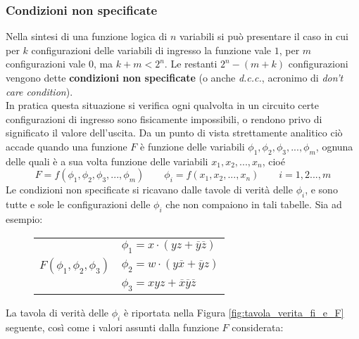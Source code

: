 \documentclass[a4paper]{extarticle}
\begin{document}
\subsubsection{Condizioni non specificate}
Nella sintesi di una funzione logica di \(n\) variabili si può presentare il caso in cui per \(k\) configurazioni delle variabili di ingresso la funzione vale \(1\), per \(m\) configurazioni vale \(0\), ma \(k + m < 2^n\). Le restanti \(2^n - (m + k)\) configurazioni vengono dette \textbf{condizioni non specificate} (o anche \emph{d.c.c.}, acronimo di \textit{don’t care condition}).\\
In pratica questa situazione si verifica ogni qualvolta in un circuito certe configurazioni di ingresso sono fisicamente impossibili, o rendono privo di significato il valore dell’uscita. Da un punto di vista strettamente analitico ciò accade quando una funzione \(F\) è funzione delle variabili \(\phi_1, \phi_2, \phi_3, ..., \phi_m\), ognuna delle quali è a sua volta funzione delle variabili \(x_1, x_2, ..., x_n\), cioé
\[F = f \left(\phi_1, \phi_2, \phi_3, ..., \phi_m\right) \hspace{2em} \phi_i = f \left(x_1, x_2, ..., x_n\right) \hspace{2em} i = 1, 2..., m\]
Le condizioni non specificate si ricavano dalle tavole di verità delle $\phi_i$, e sono tutte e sole le configurazioni delle $\phi_i$ che non compaiono in tali tabelle. Sia ad esempio:

\vspace{1em}
\noindent
\begin{figure}[H]
    \centering
    \begin{tabular}{cl}
     & \(\phi_1 = x \cdot \left(yz + \overline{y}\overline{z}\right)\)\\
     \(F \left(\phi_1, \phi_2, \phi_3\right)\) & \(\phi_2 = w \cdot \left(y\overline{x} + \overline{y}z\right)\)\\
     & \(\phi_3 = xyz + \overline{x}\overline{y}\overline{z}\)\\
    \end{tabular}
    \vspace{1em}
\end{figure}

\noindent
La tavola di verità delle $\phi_i$ è riportata nella Figura \ref{fig:tavola_verita_fi_e_F} seguente, così come i valori assunti dalla funzione $F$ considerata:
\end{document}
